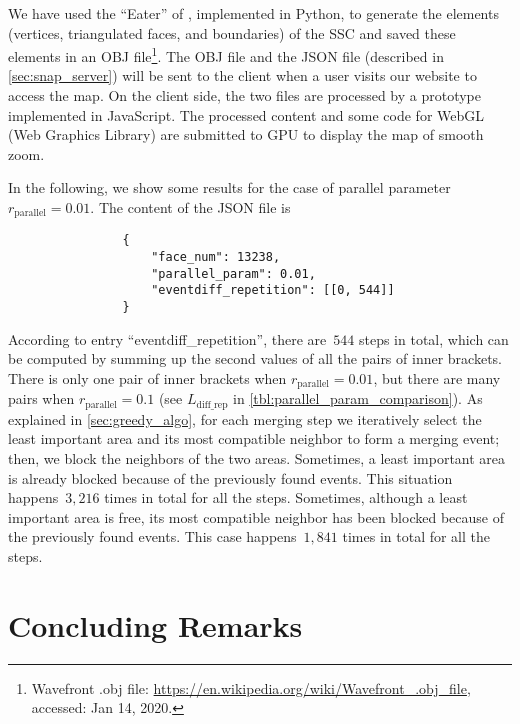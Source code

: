 \documentclass[ijgi,article,submit,moreauthors,pdftex]{Definitions/mdpi}
\begin{document}
We have used the ``Eater'' of \citet{Suba2014Merge},
implemented in Python, 
to generate the elements
(vertices, triangulated faces, and boundaries)
of the SSC \citep{vanOosterom2014tGAPSSC} 
and saved these elements in an OBJ file\footnote{%
Wavefront .obj file:
\url{https://en.wikipedia.org/wiki/Wavefront_.obj_file},
accessed: Jan 14, 2020.}.
%
The OBJ file and the JSON file (described in \sect\ref{sec:snap_server}) 
will be sent to the client 
when a user visits our website to access the map.
On the client side,
the two files are processed
by a prototype implemented in JavaScript.
The processed content and some code for WebGL (Web Graphics Library)
are submitted to GPU to display the map of smooth zoom.


In the following, we show some results for the case of 
parallel parameter~$r_\mathrm{parallel}= 0.01$.
The content of the JSON file is 
\begin{verbatim}
                {
                    "face_num": 13238,
                    "parallel_param": 0.01,                    
                    "eventdiff_repetition": [[0, 544]]
                }
\end{verbatim}
According to entry ``eventdiff\_repetition'',
there are~$544$ steps in total, 
which can be computed by summing up the second values 
of all the pairs of inner brackets.
There is only one pair of inner brackets when $r_\mathrm{parallel}= 0.01$,
but there are many pairs when $r_\mathrm{parallel}= 0.1$ 
(see $L_\mathrm{diff\_rep}$ in \tbl\ref{tbl:parallel_param_comparison}).
%
As explained in \sect\ref{sec:greedy_algo}, 
for each merging step we iteratively select the least important area 
and its most compatible neighbor to form a merging event; 
then, we block the neighbors of the two areas.
Sometimes, a least important area is already blocked 
because of the previously found events.
This situation happens~$3{,}216$ times in total for all the steps.
%
Sometimes, although a least important area is free, 
its most compatible neighbor has been blocked 
because of the previously found events.
This case happens~$1{,}841$ times in total for all the steps.
%










\section{Concluding Remarks}
\label{sec:concluding_remarks}
\end{document}
